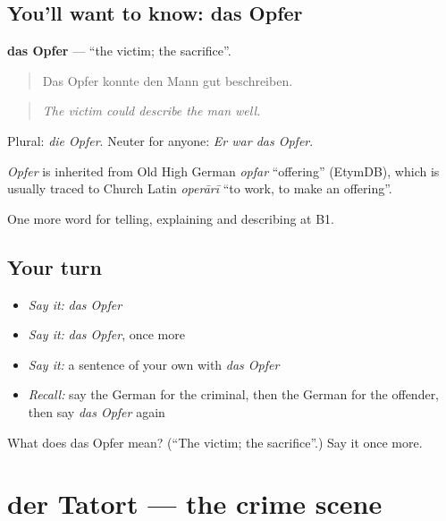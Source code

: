 \subsection*{You'll want to know: das Opfer}
\textbf{das Opfer} — \textquotedblleft{}the victim; the sacrifice\textquotedblright{}.

\begin{quote}
Das Opfer konnte den Mann gut beschreiben.
\end{quote}

\begin{quote}
\emph{The victim could describe the man well.}
\end{quote}

Plural: \emph{die Opfer}. Neuter for anyone: \emph{Er war das Opfer}.

\begin{cousinweb}
\emph{Opfer} is inherited from Old High German \emph{opfar} \textquotedblleft{}offering\textquotedblright{} (EtymDB), which is usually traced to Church Latin \emph{operārī} \textquotedblleft{}to work, to make an offering\textquotedblright{}.
\end{cousinweb}

\begin{grammarlens}[title={What you've built}]
One more word for telling, explaining and describing at B1.
\end{grammarlens}

\subsection*{Your turn}
\begin{itemize}
\raggedright
  \item \emph{Say it:} \emph{das Opfer}
  \item \emph{Say it:} \emph{das Opfer}, once more
  \item \emph{Say it:} a sentence of your own with \emph{das Opfer}
  \item \emph{Recall:} say the German for the criminal, then the German for the offender, then say \emph{das Opfer} again
\end{itemize}

\begin{tcolorbox}[breakable,colback=teal!4,colframe=teal!35!black,title={Before you move on}]
What does das Opfer mean? (\textquotedblleft{}The victim; the sacrifice\textquotedblright{}.) Say it once more.
\end{tcolorbox}
\section[der Tatort]{der Tatort — the crime scene}


